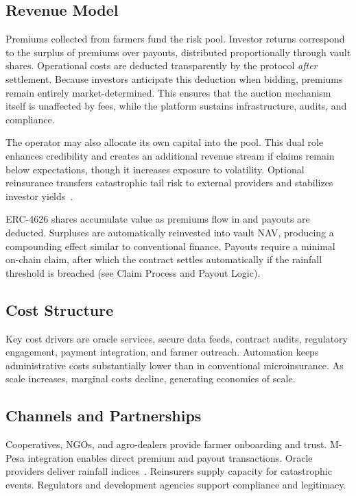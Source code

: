 \documentclass[11pt,a4paper]{article}
\begin{document}
        \subsection{Revenue Model}\label{subsec:revenue-model}
        Premiums collected from farmers fund the risk pool.
        Investor returns correspond to the surplus of premiums over payouts, distributed proportionally through vault shares.
        Operational costs are deducted transparently by the protocol \emph{after} settlement.
        Because investors anticipate this deduction when bidding, premiums remain entirely market-determined.
        This ensures that the auction mechanism itself is unaffected by fees, while the platform sustains infrastructure, audits, and compliance.

        The operator may also allocate its own capital into the pool.
        This dual role enhances credibility and creates an additional revenue stream if claims remain below expectations, though it increases exposure to volatility.
        Optional reinsurance transfers catastrophic tail risk to external providers and stabilizes investor yields~\parencite{cummins2009catastrophe}.

        ERC-4626 shares accumulate value as premiums flow in and payouts are deducted.
        Surpluses are automatically reinvested into vault NAV, producing a compounding effect similar to conventional finance.
        Payouts require a minimal on-chain claim, after which the contract settles automatically if the rainfall threshold is breached (see Claim Process and Payout Logic).

        \subsection{Cost Structure}\label{subsec:cost-structure}
        Key cost drivers are oracle services, secure data feeds, contract audits, regulatory engagement, payment integration, and farmer outreach.
        Automation keeps administrative costs substantially lower than in conventional microinsurance.
        As scale increases, marginal costs decline, generating economies of scale.

        \subsection{Channels and Partnerships}\label{subsec:channels-and-partnerships}
        Cooperatives, NGOs, and agro-dealers provide farmer onboarding and trust.
        M-Pesa integration enables direct premium and payout transactions.
        Oracle providers deliver rainfall indices~\parencite{egberts2017oracle}.
        Reinsurers supply capacity for catastrophic events.
        Regulators and development agencies support compliance and legitimacy.
\end{document}
